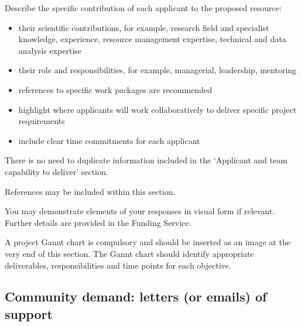\documentclass[12in]{article}
\begin{document}
{\begin{itemize}
\end{itemize}

Describe the specific contribution of each applicant to the proposed resource:

\begin{itemize}

	\item their scientific contributions, for example, research field and specialist
knowledge, experience, resource management expertise, technical and data
analysis expertise

	\item their role and responsibilities, for example, managerial, leadership, mentoring
	\item references to specific work packages are recommended
	\item highlight where applicants will work collaboratively to deliver specific project
requirements
	\item include clear time commitments for each applicant
\end{itemize}

There is no need to duplicate information included in the ‘Applicant and team
capability to deliver’ section.

References may be included within this section.

You may demonstrate elements of your responses in visual form if relevant.
Further details are provided in the Funding Service.

A project Gannt chart is compulsory and should be inserted as an image at the
very end of this section. The Gannt chart should identify appropriate
deliverables, responsibilities and time points for each objective.
}



\pagebreak

\subsection{Community demand: letters (or emails) of support}
\end{document}
